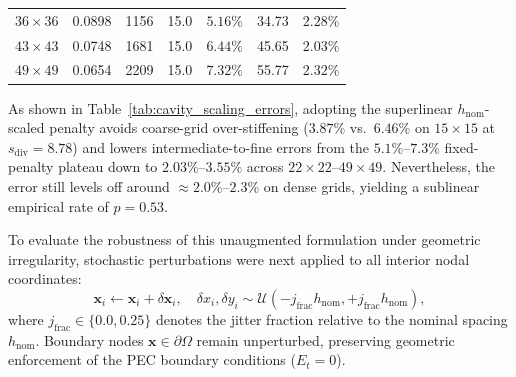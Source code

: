 \documentclass[VANCOUVER]{USG}
\begin{document}
\begin{table}[!t]
{\begin{tabular}{ccccccc}
            $36 \times 36$            & 0.0898                                       & 1156            & 15.0                                                                   & $5.16\%$                                                                                      & 34.73                              & $\mathbf{2.28\%}$                                    \\
            $43 \times 43$            & 0.0748                                       & 1681            & 15.0                                                                   & $6.44\%$                                                                                      & 45.65                              & $\mathbf{2.03\%}$                                    \\
            $49 \times 49$            & 0.0654                                       & 2209            & 15.0                                                                   & $7.32\%$                                                                                      & 55.77                              & $\mathbf{2.32\%}$                                    \\
            \bottomrule
        \end{tabular}
    }
\end{table}

As shown in Table~\ref{tab:cavity_scaling_errors}, adopting the superlinear $h_{\mathrm{nom}}$-scaled penalty avoids coarse-grid over-stiffening ($3.87\%$ vs.\ $6.46\%$ on $15 \times 15$ at $s_{\mathrm{div}} = 8.78$) and lowers intermediate-to-fine errors from the $5.1\%\text{--}7.3\%$ fixed-penalty plateau down to $2.03\%\text{--}3.55\%$ across $22\times 22\text{--}49\times 49$. Nevertheless, the error still levels off around $\approx 2.0\%\text{--}2.3\%$ on dense grids, yielding a sublinear empirical rate of $p = 0.53$.

To evaluate the robustness of this unaugmented formulation under geometric irregularity, stochastic perturbations were next applied to all interior nodal coordinates:
\begin{equation}
    \mathbf{x}_i \longleftarrow \mathbf{x}_i + \delta\mathbf{x}_i, \quad \delta x_i, \delta y_i \sim \mathcal{U}(-j_{\mathrm{frac}} h_{\mathrm{nom}}, +j_{\mathrm{frac}} h_{\mathrm{nom}}),
\end{equation}
where $j_{\mathrm{frac}} \in \{0.0, 0.25\}$ denotes the jitter fraction relative to the nominal spacing $h_{\mathrm{nom}}$. Boundary nodes $\mathbf{x} \in \partial\Omega$ remain unperturbed, preserving geometric enforcement of the PEC boundary conditions ($E_t = 0$).
\end{document}
